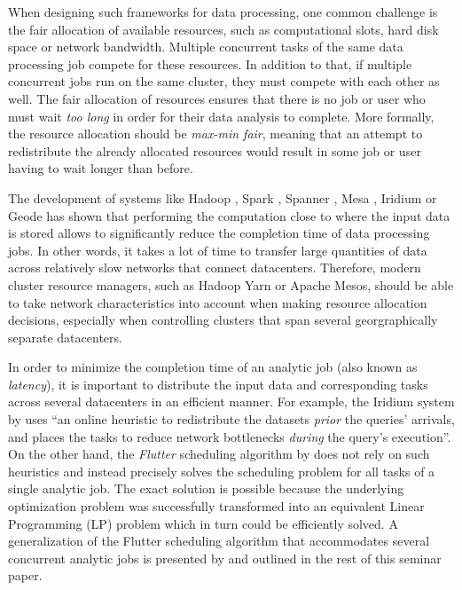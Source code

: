 When designing such frameworks for data processing, one common challenge is the fair allocation of available resources, such as computational slots, hard disk space or network bandwidth. Multiple concurrent tasks of the same data processing job compete for these resources. In addition to that, if multiple concurrent jobs run on the same cluster, they must compete with each other as well. The fair allocation of resources ensures that there is no job or user who must wait \emph{too long} in order for their data analysis to complete. More formally, the resource allocation should be \emph{max-min fair}, meaning that an attempt to redistribute the already allocated resources would result in some job or user having to wait longer than before.

The development of systems like Hadoop \cite{2008-zaharia-hadoop-late}, Spark \cite{2016-zaharia-spark}, Spanner \cite{Corbett2012}, Mesa \cite{Gupta2014}, Iridium \cite{Pu2015} or Geode \cite{Vulimiri2015} has shown that performing the computation close to where the input data is stored allows to significantly reduce the completion time of data processing jobs. In other words, it takes a lot of time to transfer large quantities of data across relatively slow networks that connect datacenters. Therefore, modern cluster resource managers, such as Hadoop Yarn or Apache Mesos, should be able to take network characteristics into account when making resource allocation decisions, especially when controlling clusters that span several georgraphically separate datacenters.

In order to minimize the completion time of an analytic job (also known as \emph{latency}), it is important to distribute the input data and corresponding tasks across several datacenters in an efficient manner. For example, the Iridium system by \citet{Pu2015} uses ``an online heuristic to redistribute the datasets \emph{prior} the queries' arrivals, and places the tasks to reduce network bottlenecks \emph{during} the query's execution''. On the other hand, the \emph{Flutter} scheduling algorithm by \citet{Hu2016} does not rely on such heuristics and instead precisely solves the scheduling problem for all tasks of a single analytic job. The exact solution is possible because the underlying optimization problem was successfully transformed into an equivalent Linear Programming (LP) problem which in turn could be efficiently solved. A generalization of the Flutter scheduling algorithm that accommodates several concurrent analytic jobs is presented by \citet{Chen2017} and outlined in the rest of this seminar paper.

